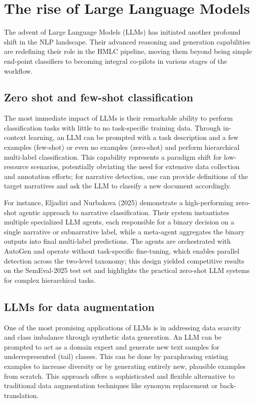 \section{The rise of Large Language Models}

The advent of Large Language Models (LLMs) has initiated another profound shift in the NLP landscape. Their advanced reasoning and generation capabilities are redefining their role in the HMLC pipeline, moving them beyond being simple end-point classifiers to becoming integral co-pilots in various stages of the workflow.

\subsection{Zero shot and few-shot classification}
The most immediate impact of LLMs is their remarkable ability to perform classification tasks with little to no task-specific training data. Through in-context learning, an LLM can be prompted with a task description and a few examples (few-shot) or even no examples (zero-shot) and perform hierarchical multi-label classification. This capability represents a paradigm shift for low-resource scenarios, potentially obviating the need for extensive data collection and annotation efforts; for narrative detection, one can provide definitions of the target narratives and ask the LLM to classify a new document accordingly.~\cite{wang-etal-2023-text2topic}

For instance, Eljadiri and Nurbakova (2025) demonstrate a high-performing zero-shot agentic approach to narrative classification. Their system instantiates multiple specialized LLM agents, each responsible for a binary decision on a single narrative or subnarrative label, while a meta-agent aggregates the binary outputs into final multi-label predictions. The agents are orchestrated with AutoGen and operate without task-specific fine-tuning, which enables parallel detection across the two-level taxonomy; this design yielded competitive results on the SemEval-2025 test set and highlights the practical zero-shot LLM systems for complex hierarchical tasks.~\cite{eljadiri-nurbakova-2025-team}


\subsection{LLMs for data augmentation}

One of the most promising applications of LLMs is in addressing data scarcity and class imbalance through synthetic data generation. An LLM can be prompted to act as a domain expert and generate new text samples for underrepresented (tail) classes. This can be done by paraphrasing existing examples to increase diversity or by generating entirely new, plausible examples from scratch. This approach offers a sophisticated and flexible alternative to traditional data augmentation techniques like synonym replacement or back-translation. \cite{cegin-etal-2025-llms,glazkova2024evaluating}

